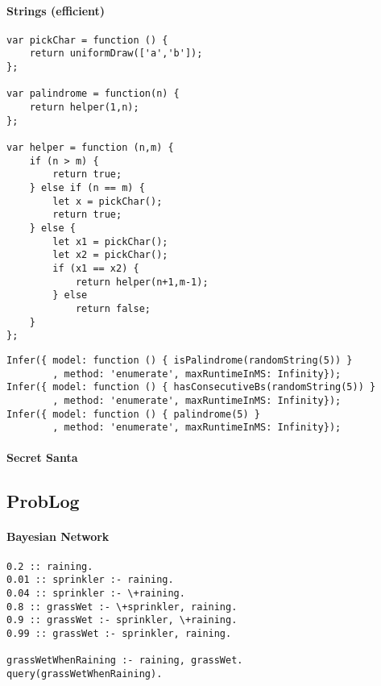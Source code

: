 \paragraph{Strings (efficient)}

\begin{verbatim}
var pickChar = function () {
    return uniformDraw(['a','b']);
};

var palindrome = function(n) {
    return helper(1,n);
};

var helper = function (n,m) {
    if (n > m) {
        return true;
    } else if (n == m) {
        let x = pickChar();
        return true;
    } else {
        let x1 = pickChar();
        let x2 = pickChar();
        if (x1 == x2) {
            return helper(n+1,m-1);
        } else
            return false;
    }
};
\end{verbatim}

\begin{verbatim}
Infer({ model: function () { isPalindrome(randomString(5)) }
        , method: 'enumerate', maxRuntimeInMS: Infinity});
Infer({ model: function () { hasConsecutiveBs(randomString(5)) }
        , method: 'enumerate', maxRuntimeInMS: Infinity});
Infer({ model: function () { palindrome(5) }
        , method: 'enumerate', maxRuntimeInMS: Infinity});
\end{verbatim}


\paragraph{Secret Santa}

\subsection{ProbLog}

\paragraph{Bayesian Network}

\begin{verbatim}
0.2 :: raining.
0.01 :: sprinkler :- raining.
0.04 :: sprinkler :- \+raining.
0.8 :: grassWet :- \+sprinkler, raining.
0.9 :: grassWet :- sprinkler, \+raining.
0.99 :: grassWet :- sprinkler, raining.

grassWetWhenRaining :- raining, grassWet.
query(grassWetWhenRaining).
\end{verbatim}

